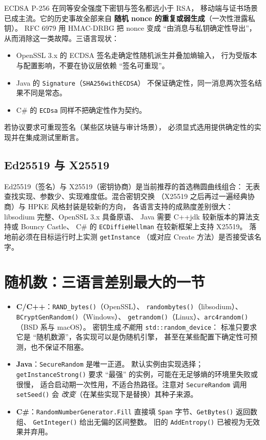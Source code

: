 \documentclass[12pt,a4paper,fontset=fandol]{ctexbook}
\newcommand{\cpp}[1]{C++#1}
\newcommand{\Fn}[1]{\texttt{#1()}}
\newcommand{\Tp}[1]{\texttt{#1}}
\newcommand{\CSharp}{C\#}
\newcommand{\CppJava}{C/C++}
\begin{document}
ECDSA P-256 在同等安全强度下密钥与签名都远小于 RSA，
移动端与证书场景已成主流。它的历史事故全部来自
\textbf{随机 nonce 的重复或弱生成}（一次性泄露私钥）。
RFC 6979 用 HMAC-DRBG 把 nonce 变成 ``由消息与私钥确定性导出''，
从而消除这一类故障。三语言现状：

\begin{itemize}
  \item OpenSSL 3.x 的 ECDSA 签名走确定性随机派生并叠加熵输入，
        行为受版本与配置影响，不要在协议层依赖 ``签名可重现''。
  \item Java 的 \Tp{Signature}（\texttt{SHA256withECDSA}）
        不保证确定性，同一消息两次签名结果不同是常态。
  \item \CSharp{} 的 \Tp{ECDsa} 同样不把确定性作为契约。
\end{itemize}

若协议要求可重现签名（某些区块链与审计场景），
必须显式选用提供确定性的实现并在集成测试里断言。

\subsection{Ed25519 与 X25519}

Ed25519（签名）与 X25519（密钥协商）是当前推荐的首选椭圆曲线组合：
无表查找实现、参数少、实现难度低。混合密钥交换
（X25519 之后再过一遍经典协商）与 HPKE 风格封装是较新的方向，
各语言支持的成熟度差别很大：libsodium 完整、OpenSSL 3.x 具备原语、
Java 需要 \cpp{jdk} 较新版本的算法支持或 Bouncy Castle、
\CSharp{} 的 \Tp{ECDiffie\allowbreak Hellman} 在较新框架上支持 X25519。
落地前必须在目标运行时上实测 \texttt{getInstance}
（或对应 Create 方法）是否接受该名字。

\section{随机数：三语言差别最大的一节}

\begin{itemize}
  \item \textbf{\CppJava{}}：\Fn{RAND\_bytes}（OpenSSL）、
        \Fn{randombytes}（libsodium）、
        \Fn{BCryptGenRandom}（Windows）、
        \Fn{getrandom}（Linux）、\Fn{arc4random}（BSD 系与 macOS）。
        密钥生成\emph{不能}用 \Tp{std::random\_device}：
        标准只要求它是 ``随机数源''，各实现可以是伪随机引擎，
        甚至在某些配置下确定性可预测，也不保证不阻塞。
  \item \textbf{Java}：\Tp{Secure\allowbreak Random} 是唯一正道。
        默认实例由实现选择；\Fn{getInstanceStrong}
        要求 ``最强'' 的实例，可能在无足够熵的环境里失败或很慢，
        适合启动期一次性用，不适合热路径。注意对
        \Tp{SecureRandom} 调用 \Fn{setSeed} 会
        \emph{改变}（在某些实现下是替换）其种子来源。
  \item \textbf{\CSharp{}}：\Tp{Random\allowbreak{}Number\allowbreak Generator.\allowbreak{}Fill}
        直接填 \Tp{Span} 字节、\Fn{Get\allowbreak Bytes} 返回数组、
        \Fn{GetInteger} 给出无偏的区间整数。
        旧的 \Fn{AddEntropy} 已被视为无效果并弃用。
\end{itemize}
\end{document}
